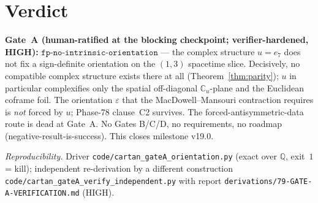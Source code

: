 \documentclass[11pt]{article}
\newcommand{\Q}{\mathbb{Q}}
\newcommand{\Cu}{\mathbb{C}_u}
\theoremstyle{plain}\newtheorem{theorem}{Theorem}
\theoremstyle{plain}\newtheorem{proposition}{Proposition}
\theoremstyle{plain}\newtheorem{corollary}{Corollary}
\theoremstyle{definition}\newtheorem{remark}{Remark}
\begin{document}
\section*{Verdict}
\noindent\textbf{Gate~A (human-ratified at the blocking checkpoint; verifier-hardened, HIGH):}
$\boxed{\texttt{fp-no-intrinsic-orientation}}$ --- the complex structure $u=e_7$ does not
fix a sign-definite orientation on the $(1,3)$ spacetime slice. Decisively, no compatible
complex structure exists there at all (Theorem~\ref{thm:parity}); $u$ in particular
complexifies only the spatial off-diagonal $\Cu$-plane and the Euclidean coframe foil. The
orientation $\varepsilon$ that the MacDowell--Mansouri contraction requires is \emph{not}
forced by $u$; Phase-78 clause~C2 survives. The forced-antisymmetric-data route is dead at
Gate~A. No Gates B/C/D, no requirements, no roadmap (negative-result-is-success). This
closes milestone v19.0.

\medskip\noindent\emph{Reproducibility.} Driver \texttt{code/cartan\_gateA\_orientation.py}
(exact over $\Q$, exit~$1$ = kill); independent re-derivation by a different construction
\texttt{code/cartan\_gateA\_verify\_independent.py} with report
\texttt{derivations/79-GATE-A-VERIFICATION.md} (HIGH).
\end{document}
